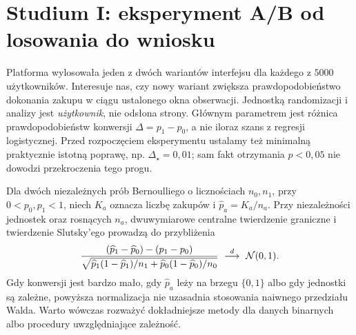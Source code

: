 \section{Studium I: eksperyment A/B od losowania do wniosku}
\begin{przyklad}
Platforma wylosowała jeden z dwóch wariantów interfejsu dla każdego z $5000$ użytkowników. Interesuje nas, czy nowy wariant zwiększa prawdopodobieństwo dokonania zakupu w ciągu ustalonego okna obserwacji. Jednostką randomizacji i analizy jest \emph{użytkownik}, nie odsłona strony. Głównym parametrem jest różnica prawdopodobieństw konwersji $\Delta=p_1-p_0$, a nie iloraz szans z regresji logistycznej. Przed rozpoczęciem eksperymentu ustalamy też minimalną praktycznie istotną poprawę, np. $\Delta_\star=0{,}01$; sam fakt otrzymania $p<0{,}05$ nie dowodzi przekroczenia tego progu.
\end{przyklad}

Dla dwóch niezależnych prób Bernoulliego o licznościach $n_0,n_1$, przy $0<p_0,p_1<1$, niech $K_a$ oznacza liczbę zakupów i $\widehat p_a=K_a/n_a$. Przy niezależności jednostek oraz rosnących $n_a$, dwuwymiarowe centralne twierdzenie graniczne i twierdzenie Slutsky'ego prowadzą do przybliżenia
\[
\frac{(\widehat p_1-\widehat p_0)-(p_1-p_0)}{\sqrt{\widehat p_1(1-\widehat p_1)/n_1+\widehat p_0(1-\widehat p_0)/n_0}}\ \overset{d}{\longrightarrow}\ \Normal(0,1).
\]
Gdy konwersji jest bardzo mało, gdy $\widehat p_a$ leży na brzegu $\{0,1\}$ albo gdy jednostki są zależne, powyższa normalizacja nie uzasadnia stosowania naiwnego przedziału Walda. Warto wówczas rozważyć dokładniejsze metody dla danych binarnych albo procedury uwzględniające zależność.

